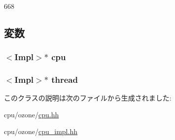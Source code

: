 \begin{DoxyCode}
668 { }
\end{DoxyCode}


\subsection{変数}
\hypertarget{classOzoneCPU_1_1OzoneTC_a80c31e32e6a8233d87983f7843046091}{
\subsubsection[{cpu}]{$<$Impl$>$$\ast$ {\bf cpu}}}
\label{classOzoneCPU_1_1OzoneTC_a80c31e32e6a8233d87983f7843046091}
\hypertarget{classOzoneCPU_1_1OzoneTC_ab6f834310107fd693035eba2eeca583f}{
\subsubsection[{thread}]{$<$Impl$>$$\ast$ {\bf thread}}}
\label{classOzoneCPU_1_1OzoneTC_ab6f834310107fd693035eba2eeca583f}


このクラスの説明は次のファイルから生成されました:\begin{DoxyCompactItemize}
\item 
cpu/ozone/\hyperlink{ozone_2cpu_8hh}{cpu.hh}\item 
cpu/ozone/\hyperlink{ozone_2cpu__impl_8hh}{cpu\_\-impl.hh}\end{DoxyCompactItemize}
